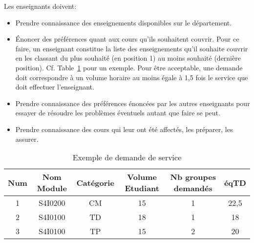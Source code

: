 Les enseignants doivent:
\begin{itemize}
	\item Prendre connaissance des enseignements disponibles sur le département.
	\item Énoncer des préférences quant aux cours qu’ils souhaitent couvrir. Pour ce faire, un enseignant constitue la liste des enseignements qu’il souhaite couvrir en les classant du plus souhaité (en position 1) au moins souhaité (dernière position). Cf. Table~\ref{table:demande} pour un exemple. 
Pour être acceptable, une demande doit correspondre à un volume horaire au moins égale à 1,5 fois le service que doit effectuer l’enseignant.
	\item Prendre connaissance des préférences énoncées par les autres enseignants pour essayer de résoudre les problèmes éventuels autant que faire se peut.
	\item Prendre connaissance des cours qui leur ont été affectés, les préparer, les assurer.
\end{itemize}

\begin{table}
	\begin{center}
	\begin{tabular}{cccccc}
		\toprule
		\textbf{Num} & \textbf{Nom Module} & \textbf{Catégorie} & \textbf{Volume Etudiant} & \textbf{Nb groupes demandés} & \textbf{éqTD} \\
		\midrule
		1 & S4I0200 & CM & 15 & 1 & 22,5 \\
		2 & S4I0100 & TD & 18 & 1 & 18 \\
		3 & S4I0100 & TP & 15 & 2 & 20 \\
		\bottomrule
	\end{tabular}
	\end{center}
	\caption{Exemple de demande de service}
	\label{table:demande}
\end{table}



